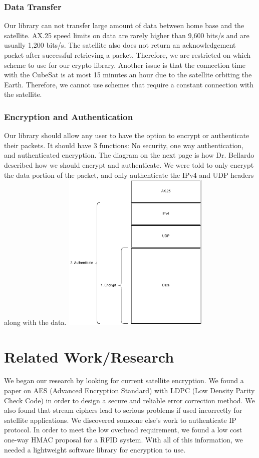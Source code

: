\documentclass[12pt]{article}
\begin{document}
\begin{multicols}{2}
\subsubsection{Data Transfer}
Our library can not transfer large amount of data between home base and the satellite. AX.25 speed limits on data are rarely higher than 9,600 bits/s and are usually 1,200 bits/s. \cite{AX25} The satellite also does not return an acknowledgement packet after successful retrieving a packet. Therefore, we are restricted on which scheme to use for our crypto library. Another issue is that the connection time with the CubeSat is at most 15 minutes an hour due to the satellite orbiting the Earth. Therefore, we cannot use schemes that require a constant connection with the satellite. 
\subsubsection{Encryption and Authentication}
Our library should allow any user to have the option to encrypt or authenticate their packets. It should have 3 functions: No security, one way authentication, and authenticated encryption. The diagram on the next page is how Dr. Bellardo described how we should encrypt and authenticate. We were told to only encrypt the data portion of the packet, and only authenticate the IPv4 and UDP headers along with the data.
\begingroup
    \centering
    \includegraphics[width=7cm]{researchDiagram.png}
\endgroup
\section{Related Work/Research}
We began our research by looking for current satellite encryption. We found a paper on AES (Advanced Encryption Standard) with LDPC (Low Density Parity Check Code) in order to design a secure and reliable error correction method. \cite{SEEC} We also found that stream ciphers lead to serious problems if used incorrectly for satellite applications. \cite{streamproblems} We discovered someone else's work to authenticate IP protocol. \cite{IPProtocol} In order to meet the low overhead requirement, we found a low cost one-way HMAC proposal for a RFID system. \cite{HMACRFID} With all of this information, we needed a lightweight software library for encryption to use. 

\end{multicols}
\end{document}
